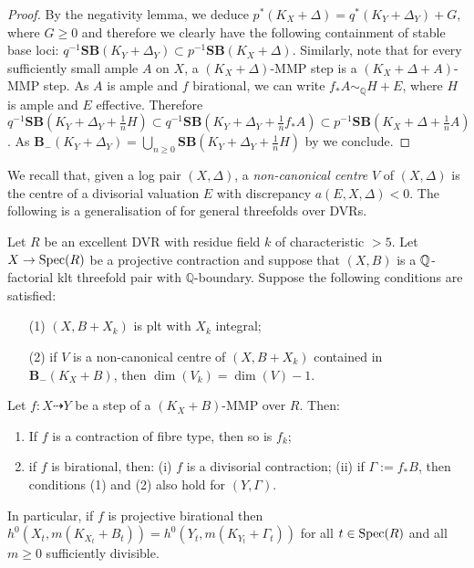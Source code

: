 \begin{proof}
	By the negativity lemma, we deduce $p^*(K_X+\Delta)=q^*(K_Y+\Delta_Y)+G,$ where $G \geq 0$ and therefore we clearly have the following containment of stable base loci: $q^{-1}\mathbf{SB}(K_Y+\Delta_Y) \subset p^{-1}\mathbf{SB}(K_X+\Delta).$
	Similarly, note that for every sufficiently small ample $A$ on $X$,
	a $(K_X+\Delta)$-MMP step is a $(K_X+\Delta+A)$-MMP step. As $A$ is ample and $f$ birational, we can write $f_*A \sim_{\mathbb{Q}} H+E$, where $H$ is ample and $E$ effective. 
	Therefore  $q^{-1}\mathbf{SB}(K_Y+\Delta_Y+\frac{1}{n}H) \subset q^{-1}\mathbf{SB}(K_Y+\Delta_Y+ \frac{1}{n}f_*A)\subset  p^{-1}\mathbf{SB}(K_X+\Delta+ \frac{1}{n}A) $.
	As $\mathbf{B}_{-}(K_Y+\Delta_Y)=\bigcup_{n \geq 0} \mathbf{SB}(K_Y+\Delta_Y+\frac{1}{n}H)$ by \cite[Proposition 1.19]{asympt-baseloci} we conclude.
\end{proof}

We recall that, given a log pair $(X,\Delta)$, a \emph{non-canonical centre} $V$ of $(X,\Delta)$ is the centre of a divisorial valuation $E$ with discrepancy $a(E, X, \Delta)<0$.  The following is a generalisation of \cite[Lemma 3.1]{HMX18} for general threefolds over DVRs. 

\begin{proposition}\label{lemma:MMP_in_fam2}
	Let $R$ be an excellent DVR with residue field $k$ of characteristic $>5$. Let $X \to \operatorname{Spec}(R)$ be a projective contraction and suppose that $(X,B)$ is a $\mathbb{Q}$-factorial klt threefold pair with $\mathbb{Q}$-boundary.
	Suppose the following conditions are satisfied:
	\begin{itemize}
		\item[(1)] $(X,B+X_k)$ is plt with $X_k$ integral;
		\item[(2)] if $V$ is a non-canonical centre of $(X,B+X_k)$ contained in ${\mathbf{B}_{-}(K_{X}+B)}$, then $\dim (V_{k})=\dim (V) -1$.
	\end{itemize}
	Let $f \colon X\dashrightarrow Y$ be a step of a $(K_X+B)$-MMP over $R$. Then:
	\begin{enumerate}
		\item  If $f$ is a contraction of fibre type, then so is $f_k$;
		\item if $f$ is birational, then:
		\subitem(i) $f$ is a divisorial contraction;
		\subitem(ii) if $\Gamma:=f_\ast B$, then conditions (1) and (2) also hold for $(Y,\Gamma)$.
	\end{enumerate} 
	In particular, if $f$ is projective birational then $h^0(X_t,m(K_{X_t}+B_t))=h^0(Y_t,m(K_{Y_t}+\Gamma_t))$ for all $t\in\operatorname{Spec} (R)$ and all $m\geq 0$ sufficiently divisible.
\end{proposition}

